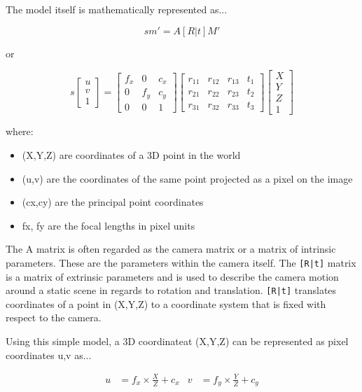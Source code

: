 \documentclass{article}
\begin{document}
The model itself is mathematically represented as...

\[
sm' = A[R|t]M'
\]

or

\[ s 
\left[\begin{array}{c} u \\ v \\ 1 \end{array} \right]
=
\begin{bmatrix}
f_x & 0 & c_x \\ 0 & f_y & c_y \\ 0 & 0 & 1
\end{bmatrix}
\begin{bmatrix}
r_{11} & r_{12} & r_{13} & t_1 \\ r_{21} & r_{22} & r_{23} & t_2 \\ r_{31} & r_{32} & r_{33} & t_3
\end{bmatrix}
\left[\begin{array}{c} X \\ Y \\ Z \\ 1 \end{array} \right]
 \]
 
where:

\begin{itemize}
	\item (X,Y,Z) are coordinates of a 3D point in the world
	\item (u,v) are the coordinates of the same point projected as a pixel on the image
	\item (cx,cy) are the principal point coordinates
	\item fx, fy are the focal lengths in pixel units
\end{itemize}

The A matrix is often regarded as the camera matrix or a matrix of intrinsic parameters. These are the parameters within the camera itself. The \lstinline![R|t]! matrix is a matrix of extrinsic parameters and is used to describe the camera motion around a static scene in regards to rotation and translation. \lstinline![R|t]! translates coordinates of a point in (X,Y,Z) to a coordinate system that is fixed with respect to the camera. 

Using this simple model, a 3D coordinateat (X,Y,Z) can be represented as pixel coordinates u,v as...

\begin{align*}
u&=f_x \times \frac{X}{Z} + c_x & v&=f_y \times \frac{Y}{Z} + c_y
\end{align*}
\end{document}
